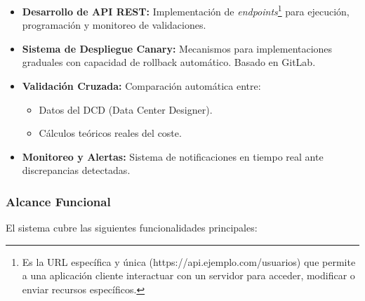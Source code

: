 \begin{itemize}
    \item \textbf{Desarrollo de API REST:} Implementación de \textit{endpoints}\footnote{Es la URL específica y única (https://api.ejemplo.com/usuarios) que permite a una aplicación cliente interactuar con un servidor para acceder, modificar o enviar recursos específicos.}  para ejecución, programación y monitoreo de validaciones.

    \item \textbf{Sistema de Despliegue Canary:} Mecanismos para implementaciones graduales con capacidad de rollback automático. Basado en GitLab.

    \item \textbf{Validación Cruzada:} Comparación automática entre:
          \begin{itemize}
              \item Datos del DCD (Data Center Designer).
              \item Cálculos teóricos reales del coste.
          \end{itemize}

    \item \textbf{Monitoreo y Alertas:} Sistema de notificaciones en tiempo real ante discrepancias detectadas.
\end{itemize}

\subsubsection{Alcance Funcional}

El sistema cubre las siguientes funcionalidades principales:

